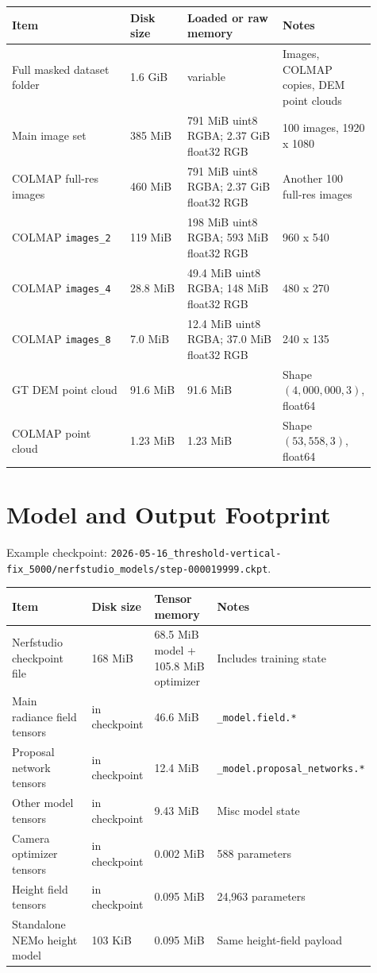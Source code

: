 \documentclass[10pt]{article}
\begin{document}
\begin{center}
\small
\begin{tabular}{p{0.31\linewidth}p{0.15\linewidth}p{0.25\linewidth}p{0.20\linewidth}}
\toprule
Item & Disk size & Loaded or raw memory & Notes \\
\midrule
Full masked dataset folder & 1.6 GiB & variable & Images, COLMAP copies, DEM point clouds \\
Main image set & 385 MiB & 791 MiB uint8 RGBA; 2.37 GiB float32 RGB & 100 images, 1920 x 1080 \\
COLMAP full-res images & 460 MiB & 791 MiB uint8 RGBA; 2.37 GiB float32 RGB & Another 100 full-res images \\
COLMAP \texttt{images\_2} & 119 MiB & 198 MiB uint8 RGBA; 593 MiB float32 RGB & 960 x 540 \\
COLMAP \texttt{images\_4} & 28.8 MiB & 49.4 MiB uint8 RGBA; 148 MiB float32 RGB & 480 x 270 \\
COLMAP \texttt{images\_8} & 7.0 MiB & 12.4 MiB uint8 RGBA; 37.0 MiB float32 RGB & 240 x 135 \\
GT DEM point cloud & 91.6 MiB & 91.6 MiB & Shape $(4{,}000{,}000, 3)$, float64 \\
COLMAP point cloud & 1.23 MiB & 1.23 MiB & Shape $(53{,}558, 3)$, float64 \\
\bottomrule
\end{tabular}
\end{center}

\section{Model and Output Footprint}

Example checkpoint: \texttt{2026-05-16\_threshold-vertical-fix\_5000/nerfstudio\_models/step-000019999.ckpt}.

\begin{center}
\small
\begin{tabular}{p{0.34\linewidth}p{0.17\linewidth}p{0.22\linewidth}p{0.18\linewidth}}
\toprule
Item & Disk size & Tensor memory & Notes \\
\midrule
Nerfstudio checkpoint file & 168 MiB & 68.5 MiB model + 105.8 MiB optimizer & Includes training state \\
Main radiance field tensors & in checkpoint & 46.6 MiB & \texttt{\_model.field.*} \\
Proposal network tensors & in checkpoint & 12.4 MiB & \texttt{\_model.proposal\_networks.*} \\
Other model tensors & in checkpoint & 9.43 MiB & Misc model state \\
Camera optimizer tensors & in checkpoint & 0.002 MiB & 588 parameters \\
Height field tensors & in checkpoint & 0.095 MiB & 24,963 parameters \\
Standalone NEMo height model & 103 KiB & 0.095 MiB & Same height-field payload \\
\bottomrule
\end{tabular}
\end{center}
\end{document}
